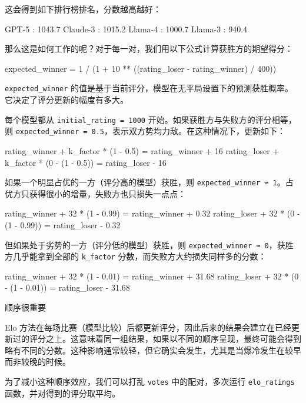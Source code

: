 这会得到如下排行榜排名，分数越高越好：

\begin{codebox}
GPT-5    : 1043.7
Claude-3 : 1015.2
Llama-4  : 1000.7
Llama-3  : 940.4
\end{codebox}

那么这是如何工作的呢？对于每一对，我们用以下公式计算获胜方的期望得分：

\begin{codebox}
expected_winner = 1 / (1 + 10 ** ((rating_loser - rating_winner) / 400))
\end{codebox}

\texttt{expected\_winner} 的值是基于当前评分，模型在无平局设置下的预测获胜概率。它决定了评分更新的幅度有多大。

每个模型都从 \texttt{initial\_rating = 1000} 开始。如果获胜方与失败方的评分相等，则 \texttt{expected\_winner = 0.5}，表示双方势均力敌。在这种情况下，更新如下：

\begin{codebox}
rating_winner + k_factor * (1 - 0.5) = rating_winner + 16
rating_loser  + k_factor * (0 - (1 - 0.5)) = rating_loser - 16
\end{codebox}

如果一个明显占优的一方（评分高的模型）获胜，则 \texttt{expected\_winner ≈ 1}。占优方只获得很小的增量，失败方也只损失一点点：

\begin{codebox}
rating_winner + 32 * (1 - 0.99) = rating_winner + 0.32
rating_loser  + 32 * (0 - (1 - 0.99)) = rating_loser - 0.32
\end{codebox}

但如果处于劣势的一方（评分低的模型）获胜，则 \texttt{expected\_winner ≈ 0}，获胜方几乎能拿到全部的 \texttt{k\_factor} 分数，而失败方大约损失同样多的分数：

\begin{codebox}
rating_winner + 32 * (1 - 0.01) = rating_winner + 31.68
rating_loser  + 32 * (0 - (1 - 0.01)) = rating_loser - 31.68
\end{codebox}

\begin{mySidebar}{顺序很重要}

Elo 方法在每场比赛（模型比较）后都更新评分，因此后来的结果会建立在已经更新过的评分之上。这意味着同一组结果，如果以不同的顺序呈现，最终可能会得到略有不同的分数。这种影响通常较轻，但它确实会发生，尤其是当爆冷发生在较早而非较晚的时候。

为了减小这种顺序效应，我们可以打乱 \texttt{votes} 中的配对，多次运行 \texttt{elo\_ratings} 函数，并对得到的评分取平均。

\end{mySidebar}

